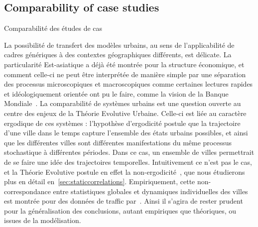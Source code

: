 \bigskip





\subsection{Comparability of case studies}{Comparabilité des études de cas}


La possibilité de transfert des modèles urbains, au sens de l'applicabilité de cadres génériques à des contextes géographiques différents, est délicate. La particularité Est-asiatique a déjà été montrée pour la structure économique, et comment celle-ci ne peut être interprétée de manière simple par une séparation des processus microscopiques et macroscopiques comme certaines lectures rapides et idéologiquement orientée ont pu le faire, comme la vision de la Banque Mondiale~\cite{amsden1994isn}. La comparabilité de systèmes urbains est une question ouverte au centre des enjeux de la Théorie Evolutive Urbaine. Celle-ci est liée au caractère ergodique de ces systèmes : l'hypothèse d'ergodicité postule que la trajectoire d'une ville dans le temps capture l'ensemble des états urbains possibles, et ainsi que les différentes villes sont différentes manifestations du même processus stochastique à différentes périodes. Dans ce cas, un ensemble de villes permettrait de se faire une idée des trajectoires temporelles. Intuitivement ce n'est pas le cas, et la Théorie Evolutive postule en effet la non-ergodicité~\cite{pumain2012urban}, que nous étudierons plus en détail en~\ref{sec:staticcorrelations}. Empiriquement, cette non-correspondance entre statistiques globales et dynamiques individuelles des villes est montrée pour des données de traffic par~\cite{2017arXiv171009559D}. Ainsi il s'agira de rester prudent pour la généralisation des conclusions, autant empiriques que théoriques, ou issues de la modélisation.








\stars




